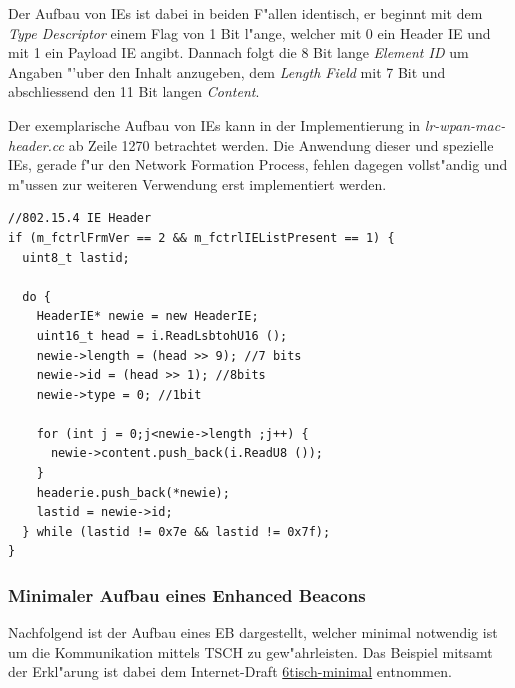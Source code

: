 Der Aufbau von IEs ist dabei in beiden F"allen identisch, er beginnt mit dem
\textit{Type Descriptor} einem Flag von 1 Bit l"ange, welcher mit 0 ein Header IE
und mit 1 ein Payload IE angibt. Dannach folgt die 8 Bit lange \textit{Element ID}
um Angaben "'uber den Inhalt anzugeben, dem \textit{Length Field} mit 7 Bit und
abschliessend den 11 Bit langen \textit{Content}.

Der exemplarische Aufbau von IEs kann in der Implementierung in \textit{lr-wpan-mac-header.cc}
ab Zeile 1270 betrachtet werden. Die Anwendung dieser und spezielle IEs, gerade
f"ur den Network Formation Process, fehlen dagegen vollst"andig und m"ussen zur
weiteren Verwendung erst implementiert werden.

\begin{lstlisting}[frame=single]
//802.15.4 IE Header
if (m_fctrlFrmVer == 2 && m_fctrlIEListPresent == 1) {
  uint8_t lastid;

  do {
    HeaderIE* newie = new HeaderIE;
    uint16_t head = i.ReadLsbtohU16 ();
    newie->length = (head >> 9); //7 bits
    newie->id = (head >> 1); //8bits
    newie->type = 0; //1bit

    for (int j = 0;j<newie->length ;j++) {
      newie->content.push_back(i.ReadU8 ());
    }
    headerie.push_back(*newie);
    lastid = newie->id;
  } while (lastid != 0x7e && lastid != 0x7f);
}

\end{lstlisting}
\subsubsection{Minimaler Aufbau eines Enhanced Beacons}
\label{sec:Aufbau_Enhanced_Beacons}
Nachfolgend ist der Aufbau eines EB dargestellt, welcher minimal notwendig
ist um die Kommunikation mittels TSCH zu gew"ahrleisten.
Das Beispiel mitsamt der Erkl"arung ist dabei dem Internet-Draft
\href{https://tools.ietf.org/pdf/draft-ietf-6tisch-minimal-12.pdf#16}{6tisch-minimal}
entnommen.

